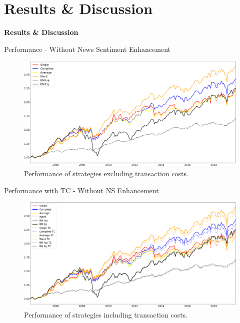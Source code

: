 \section{Results \& Discussion}
\begin{frame}[noframenumbering]
	\begin{center}
	    \textbf{\huge{Results \& Discussion}}
	\end{center}
\end{frame}


\begin{frame}{Performance - Without News Sentiment Enhancement}
\begin{figure}[h]
    \centering
    \includegraphics[width=1\textwidth]{Figures/perf_noTC_without_NS_F_1_B_0_LB_12_0.png}
    \caption{Performance of strategies excluding transaction costs.}
\end{figure}
\end{frame}

\begin{frame}{Performance with TC - Without NS Enhancement}
\begin{figure}[h]
    \centering
    \includegraphics[width=1\textwidth]{Figures/perf_noTC_andTC_without_NS_F_1_B_0_LB_12_0.png}
    \caption{Performance of strategies including transaction costs.}
\end{figure}
\end{frame}

